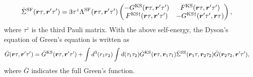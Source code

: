 %
\begin{equation}
	\bar{\Sigma}^{\rm SF}(\bm r \tau, \bm r' \tau') = 3\tau^z 
	\Lambda^{\rm SF}(\bm r \tau, \bm r' \tau')
	\begin{pmatrix}
		-G^{\rm KS}(\bm r \tau, \bm r' \tau')  &   F^{\rm KS}(\bm r \tau, \bm r' \tau')   \\
		F^{\rm KS\dag}(\bm r \tau, \bm r' \tau')  & -G^{\rm KS\dag}(\bm r' \tau', \bm r \tau)
	\end{pmatrix},
	\label{eq:SFself}
\end{equation}
%
where $\tau^z$ is the third Pauli matrix. 
With the above self-energy, the Dyson's equation of Green's equation is written as 
%
\begin{equation}
	\bar{G}(\bm r \tau, \bm r' \tau') = \bar{G}^{\rm KS}(\bm r \tau, \bm r' \tau') +
	\int d^{3}(r_1 r_2)\int d(\tau_1 \tau_2)\bar{G}^{\rm KS}(\bm r \tau, \bm r_1 \tau_1)
	\bar{\Sigma}^{\rm SS}(\bm r_1 \tau, \bm r_2 \tau_2)\bar{G}(\bm r_2 \tau_2, \bm r' \tau'),
	\label{eq:GDysoneq}
\end{equation}
%
where $\bar{G}$ indicates the full Green's function. 

